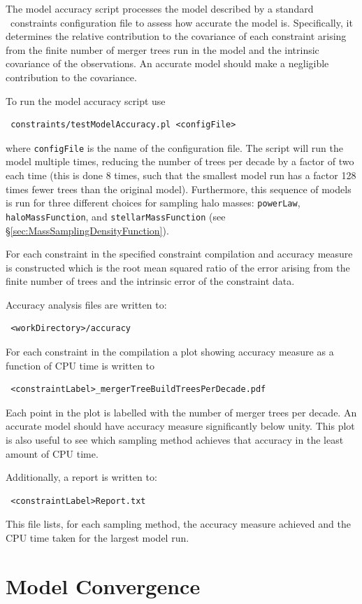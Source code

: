 The model accuracy script processes the model described by a standard \glc\ constraints configuration file to assess how accurate the model is. Specifically, it determines the relative contribution to the covariance of each constraint arising from the finite number of merger trees run in the model and the intrinsic covariance of the observations. An accurate model should make a negligible contribution to the covariance.

To run the model accuracy script use
\begin{verbatim}
 constraints/testModelAccuracy.pl <configFile>
\end{verbatim}
where {\tt configFile} is the name of the configuration file. The script will run the model multiple times, reducing the number of trees per decade by a factor of two each time (this is done 8 times, such that the smallest model run has a factor 128 times fewer trees than the original model). Furthermore, this sequence of models is run for three different choices for sampling halo masses: {\tt powerLaw}, {\tt haloMassFunction}, and {\tt stellarMassFunction} (see \S\ref{sec:MassSamplingDensityFunction}).

For each constraint in the specified constraint compilation and accuracy measure is constructed which is the root mean squared ratio of the error arising from the finite number of trees and the intrinsic error of the constraint data. 

Accuracy analysis files are written to:
\begin{verbatim}
 <workDirectory>/accuracy
\end{verbatim}
For each constraint in the compilation a plot showing accuracy measure as a function of CPU time is written to
\begin{verbatim}
 <constraintLabel>_mergerTreeBuildTreesPerDecade.pdf
\end{verbatim}
Each point in the plot is labelled with the number of merger trees per decade. An accurate model should have accuracy measure significantly below unity. This plot is also useful to see which sampling method achieves that accuracy in the least amount of CPU time.

Additionally, a report is written to:
\begin{verbatim}
 <constraintLabel>Report.txt
\end{verbatim}
This file lists, for each sampling method, the accuracy measure achieved and the CPU time taken for the largest model run.

\section{Model Convergence}\label{sec:ModelConvergence}

